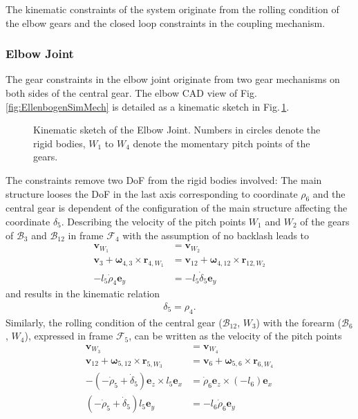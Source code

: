 \documentclass[letterpaper, 10 pt, conference]{ieeeconf}  %
\newcommand{\body}[1]{\mathcal{B}_{#1}}
\newcommand{\ks}[1]{\mathcal{F}_{#1}}
\begin{document}
The kinematic constraints of the system originate from the rolling condition of the elbow gears and the closed loop constraints in the coupling mechanism.

\subsubsection{Elbow Joint}

The gear constraints in the elbow joint originate from two gear mechanisms on both sides of the central gear.
The elbow CAD view of Fig.\,\ref{fig:EllenbogenSimMech} is detailed as a kinematic sketch in Fig.\,\ref{fig:KAS5_elbow}.
%
\begin{figure}[htb]
    \small
    \begin{minipage}[t]{7.5cm}
        \vspace{0.2cm} %
        
    \end{minipage}
    
    \caption{Kinematic sketch of the Elbow Joint. Numbers in circles denote the rigid bodies, $W_1$ to $W_4$ denote the momentary pitch points of the gears.}
    \label{fig:KAS5_elbow}
\end{figure}
%
The constraints remove two DoF from the rigid bodies involved:
The main structure looses the DoF in the last axis corresponding to coordinate $\rho_6$ and the central gear is dependent of the configuration of the main structure affecting the coordinate $\delta_5$.
%
Describing the velocity of the pitch points $W_1$ and $W_2$ of the gears of $\body{3}$ and $\body{12}$ in frame $\ks{4}$ with the assumption of no backlash leads to
%
\begin{align}
\bm{v}_{W_1} &= \bm{v}_{W_2} \\
\bm{v}_{3} +\bm{\omega}_{4,3} \times \bm{r}_{4,W_1} &= \bm{v}_{12} +\bm{\omega}_{4,12} \times \bm{r}_{12,W_2} \\
-l_{5}\dot{\rho}_4\bm{e}_y &= -l_{5}\dot{\delta}_5\bm{e}_y
\end{align}
%
and results in the kinematic relation
%
\begin{align}
\delta_5 = \rho_4.
\label{equ:delta5_explicit}
\end{align}
%
Similarly, the rolling condition of the central gear ($\body{12}$, $W_3$) with the forearm ($\body{6}$, $W_4$), expressed in frame $\ks{5}$, can be written as the velocity of the pitch points
%
\begin{align}
\bm{v}_{W_3} &= \bm{v}_{W_4} \\
\bm{v}_{12} +\bm{\omega}_{5,12} \times \bm{r}_{5,W_3} &= \bm{v}_{6} +\bm{\omega}_{5,6} \times \bm{r}_{6,W_4} \\
-(-\dot{\rho}_5+\dot{\delta}_5)\bm{e}_z \times l_5\bm{e}_x &= \dot{\rho}_6\bm{e}_z \times (-l_6)\bm{e}_x \\
(-\dot{\rho}_5+\dot{\delta}_5) l_5 \bm{e}_y &= -l_6 \dot{\rho}_6\bm{e}_y
\end{align}
\end{document}
